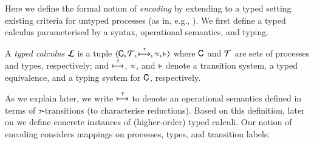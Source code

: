 \noi Here we define the formal notion of \emph{encoding} by 
extending to a typed setting existing criteria for untyped processes (as in, e.g.,
\cite{Nestmann00,Palamidessi03,DBLP:conf/lics/PalamidessiSVV06,DBLP:journals/iandc/Gorla10,DBLP:conf/icalp/LanesePSS10,DBLP:journals/tcs/FuL10,DBLP:journals/corr/abs-1208-2750}). 
We first define a typed calculus parameterised by a syntax, operational semantics, and typing.

\smallskip 

\begin{definition}\label{d:tcalculus}\rm
	A \emph{typed calculus} $\mathcal{L}$ is a tuple
	$\langle \mathsf{C}, \cal{T}, \stackrel{\tau}{\longmapsto}, \approx, \vdash \rangle$
	where $\mathsf{C}$ and $\cal{T}$ are sets of processes and types, 
	respectively; and $\stackrel{\tau}{\longmapsto}$, $\approx$, and $\vdash$ 
	denote a transition system, a typed equivalence,
	and a typing system for $\mathsf{C}$, respectively. 
\end{definition}

%
%
%
%

\smallskip 

\noi 
As we explain later, we write $\stackrel{\tau}{\longmapsto}$ to denote an operational semantics defined in terms of
$\tau$-transitions (to characterise reductions).
Based on this definition, later on we define concrete instances of (higher-order) typed calculi.
Our notion of encoding considers mappings on processes, 
types, and transition labels: 

